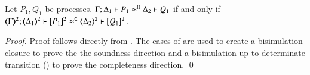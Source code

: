 \begin{proposition}\myrm
	\label{app:prop:fulla_HOp_to_p}
	Let $P_1, Q_1$ be \HOp processes.
	$\Gamma; \Delta_1 \vdash P_1 \approx^\mathtt{H} \Delta_2 \vdash Q_1$
	if and only if
	$\horel{\tmap{\Gamma}{2}}{\tmap{\Delta_1}{2}}{\pmap{P_1}{2}}{\fwb}{\tmap{\Delta_2}{2}}{\pmap{Q_1}{2}}$.
\end{proposition}

\begin{proof}

%
	Proof follows directly from . The cases
	of  are used to create a
	bisimulation closure to prove the the soundness direction and
	a bisimulation up to determinate transition ()
	to prove the
	completeness direction.
	\qed
\end{proof}




%

